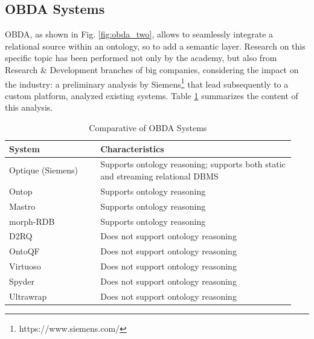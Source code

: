 \subsection{OBDA Systems}
\ac{OBDA}, as shown in Fig. \ref{fig:obda_two}, allows to seamlessly integrate a relational source within an ontology, so to add a semantic layer. Research on this specific topic has been performed not only by the academy, but also from Research \& Development branches of big companies, considering the impact on the industry: a preliminary analysis \cite{DBLP:conf/semweb/KharlamovSOZHLRSW14} by Siemens\footnote{https://www.siemens.com/} that lead subsequently to a custom platform, analyzed existing systems. Table \ref{tab:obda_comparison} summarizes the content of this analysis.
\begin{table}[ht!]
    \centering
    \begin{tabular}{| p{0.3\linewidth} | p{0.64\linewidth} |}
    \hline
    \textbf{System} & \textbf{Characteristics} \\ \hline
    Optique (Siemens)  & Supports ontology reasoning; supports both static and streaming relational \ac{DBMS} \\ \hline
    Ontop  & Supports ontology reasoning \\ \hline
    Mastro  & Supports ontology reasoning \\ \hline
    morph-RDB  & Supports ontology reasoning \\ \hline
    D2RQ  & Does not support ontology reasoning \\ \hline
    OntoQF  & Does not support ontology reasoning \\ \hline
    Virtuoso  & Does not support ontology reasoning \\ \hline
    Spyder  & Does not support ontology reasoning \\ \hline
    Ultrawrap  & Does not support ontology reasoning \\ \hline
    \end{tabular}
    \caption{Comparative of \ac{OBDA} Systems \label{tab:obda_comparison}}
\end{table}


